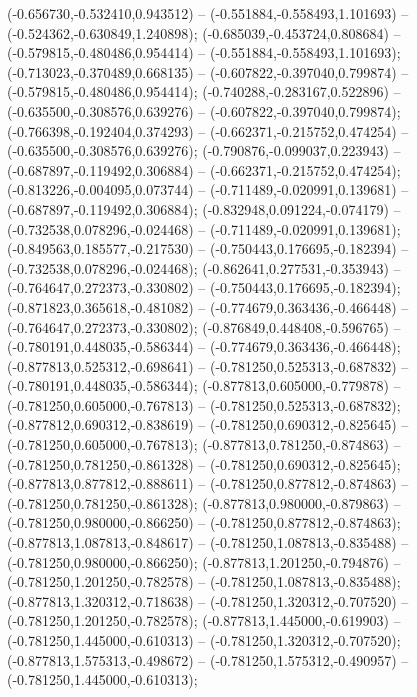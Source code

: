  (-0.656730,-0.532410,0.943512) -- (-0.551884,-0.558493,1.101693) -- (-0.524362,-0.630849,1.240898);
 (-0.685039,-0.453724,0.808684) -- (-0.579815,-0.480486,0.954414) -- (-0.551884,-0.558493,1.101693);
 (-0.713023,-0.370489,0.668135) -- (-0.607822,-0.397040,0.799874) -- (-0.579815,-0.480486,0.954414);
 (-0.740288,-0.283167,0.522896) -- (-0.635500,-0.308576,0.639276) -- (-0.607822,-0.397040,0.799874);
 (-0.766398,-0.192404,0.374293) -- (-0.662371,-0.215752,0.474254) -- (-0.635500,-0.308576,0.639276);
 (-0.790876,-0.099037,0.223943) -- (-0.687897,-0.119492,0.306884) -- (-0.662371,-0.215752,0.474254);
 (-0.813226,-0.004095,0.073744) -- (-0.711489,-0.020991,0.139681) -- (-0.687897,-0.119492,0.306884);
 (-0.832948,0.091224,-0.074179) -- (-0.732538,0.078296,-0.024468) -- (-0.711489,-0.020991,0.139681);
 (-0.849563,0.185577,-0.217530) -- (-0.750443,0.176695,-0.182394) -- (-0.732538,0.078296,-0.024468);
 (-0.862641,0.277531,-0.353943) -- (-0.764647,0.272373,-0.330802) -- (-0.750443,0.176695,-0.182394);
 (-0.871823,0.365618,-0.481082) -- (-0.774679,0.363436,-0.466448) -- (-0.764647,0.272373,-0.330802);
 (-0.876849,0.448408,-0.596765) -- (-0.780191,0.448035,-0.586344) -- (-0.774679,0.363436,-0.466448);
 (-0.877813,0.525312,-0.698641) -- (-0.781250,0.525313,-0.687832) -- (-0.780191,0.448035,-0.586344);
 (-0.877813,0.605000,-0.779878) -- (-0.781250,0.605000,-0.767813) -- (-0.781250,0.525313,-0.687832);
 (-0.877812,0.690312,-0.838619) -- (-0.781250,0.690312,-0.825645) -- (-0.781250,0.605000,-0.767813);
 (-0.877813,0.781250,-0.874863) -- (-0.781250,0.781250,-0.861328) -- (-0.781250,0.690312,-0.825645);
 (-0.877813,0.877812,-0.888611) -- (-0.781250,0.877812,-0.874863) -- (-0.781250,0.781250,-0.861328);
 (-0.877813,0.980000,-0.879863) -- (-0.781250,0.980000,-0.866250) -- (-0.781250,0.877812,-0.874863);
 (-0.877813,1.087813,-0.848617) -- (-0.781250,1.087813,-0.835488) -- (-0.781250,0.980000,-0.866250);
 (-0.877813,1.201250,-0.794876) -- (-0.781250,1.201250,-0.782578) -- (-0.781250,1.087813,-0.835488);
 (-0.877813,1.320312,-0.718638) -- (-0.781250,1.320312,-0.707520) -- (-0.781250,1.201250,-0.782578);
 (-0.877813,1.445000,-0.619903) -- (-0.781250,1.445000,-0.610313) -- (-0.781250,1.320312,-0.707520);
 (-0.877813,1.575313,-0.498672) -- (-0.781250,1.575312,-0.490957) -- (-0.781250,1.445000,-0.610313);
